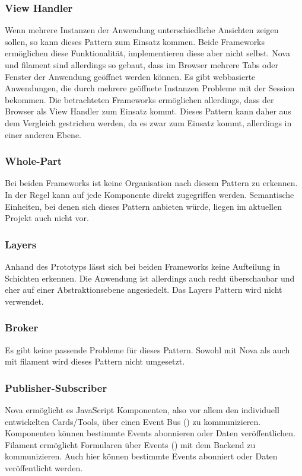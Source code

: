 \subsubsection{View Handler}
Wenn mehrere Instanzen der Anwendung unterschiedliche Ansichten zeigen sollen, so kann dieses Pattern zum Einsatz kommen.
Beide Frameworks ermöglichen diese Funktionalität, implementieren diese aber nicht selbst.
Nova und filament sind allerdings so gebaut, dass im Browser mehrere Tabs oder Fenster der Anwendung geöffnet werden können.
Es gibt webbasierte Anwendungen, die durch mehrere geöffnete Instanzen Probleme mit der Session bekommen.
Die betrachteten Frameworks ermöglichen allerdings, dass der Browser als View Handler zum Einsatz kommt.
Dieses Pattern kann daher aus dem Vergleich gestrichen werden, da es zwar zum Einsatz kommt, allerdings in einer anderen Ebene.

\subsubsection{Whole-Part}
Bei beiden Frameworks ist keine Organisation nach diesem Pattern zu erkennen.
In der Regel kann auf jede Komponente direkt zugegriffen werden.
Semantische Einheiten, bei denen sich dieses Pattern anbieten würde, liegen im aktuellen Projekt auch nicht vor.

\subsubsection{Layers}
Anhand des Prototyps lässt sich bei beiden Frameworks keine Aufteilung in Schichten erkennen.
Die Anwendung ist allerdings auch recht überschaubar und eher auf einer Abstraktionsebene angesiedelt.
Das Layers Pattern wird nicht verwendet.

\subsubsection{Broker}
Es gibt keine passende Probleme für dieses Pattern.
Sowohl mit Nova als auch mit filament wird dieses Pattern nicht umgesetzt.

\subsubsection{Publisher-Subscriber}
Nova ermöglicht es JavaScript Komponenten, also vor allem den individuell entwickelten Cards/Tools, über einen Event Bus (\cite{nova-docs-events}) zu kommunizieren.
Komponenten können bestimmte Events abonnieren oder Daten veröffentlichen.
Filament ermöglicht Formularen über Events (\cite{filament-docs-events}) mit dem Backend zu kommunizieren.
Auch hier können bestimmte Events abonniert oder Daten veröffentlicht werden.

